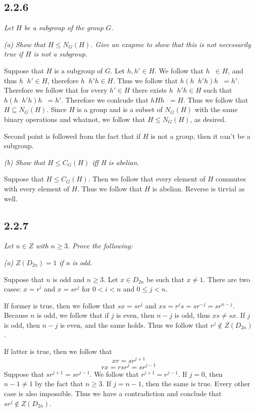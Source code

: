 \documentclass[11pt,oneside,titlepage]{book}
\DeclareMathOperator \inv {^{-1}}
\begin{document}
\subsection*{2.2.6}

\textit{Let $H$ be a subgroup of the group $G$.}

\textit{(a) Show that $H \leq N_G(H)$. Give an exapme to show that this is not necessarily
  true if $H$ is not a subgroup.}

Suppose that $H$ is a subgroup of $G$. Let $h, h' \in H$. We follow that
$h \inv \in H$, and thus $h \inv h' \in H$, therefore $h\inv h' h \in H$. Thus we follow that
$h (h\inv h' h) h\inv = h'$. Therefore we follow that for every $h' \in H$ there exists
$h\inv h' h \in H$ such that $h (h\inv h' h) h\inv = h'$. Therefore we conlcude that
$h H h\inv = H$. Thus we follow that $H \subseteq N_G(H)$. Since $H$ is a group and
is a subset of $N_G(H)$ with the same binary operations and whatnot, we follow that
$H \leq N_G(H)$, as desired.

Second point is followed from the fact that if $H$ is not a group, then it can't be a subgroup.

\textit{(b) Show that $H \leq C_G(H)$ iff H is abelian.}

Suppose that $H \leq C_G(H)$. Then we follow that every element of $H$ commutes with every
element of $H$. Thus we follow that $H$ is abelian. Reverse is tirvial as well.


\subsection*{2.2.7}

\textit{Let $n \in Z$ with $n \geq 3$. Prove the following: }

\textit{(a) $Z(D_{2n}) = 1$ if n is odd.}

Suppose that $n$ is odd and $n \geq 3$. Let $x \in D_{2n}$ be such that $x \neq 1$.
There are two cases: $x = r^i$ and $x = sr^j$ for $0 < i < n$ and $0 \leq j < n$.

If former is true, then we follow that
$sx = sr^j$ and $xs = r^j s = s r^{-j} = s r^{n - j}$. Because $n$ is odd, we follow that if $j$
is even, then $n - j$ is odd, thus $xs \neq sx$. If $j$ is odd, then $n - j$ is even, and
the same holds. Thus we follow that $r^j \notin Z(D_{2n})$. 

If latter is true, then we follow that
$$x r = sr^{j + 1}$$
$$r x = rsr^{j} = sr^{j - 1}$$
Suppose that $sr^{j + 1} = sr^{j - 1}$. We follow that $r^{j + 1} = r^{j - 1}$. If $j = 0$, then
$n - 1 \neq 1$ by the fact that $n \geq 3$. If $j = n - 1$, then the same is true.
Every other case is also impossible. Thus we have a contradiction and conclude that
$sr^j \notin Z(D_{2n})$.
\end{document}
